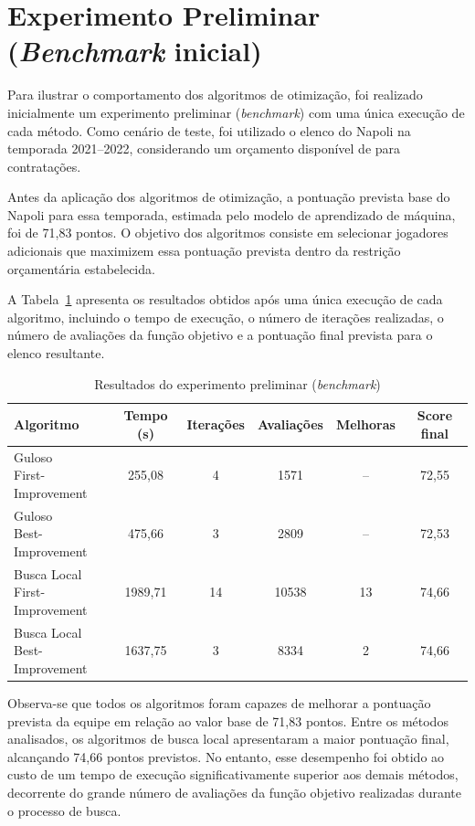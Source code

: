 \section{Experimento Preliminar (\textit{Benchmark} inicial)}

Para ilustrar o comportamento dos algoritmos de otimização, foi realizado inicialmente um experimento preliminar (\textit{benchmark}) com uma única execução de cada método. 
Como cenário de teste, foi utilizado o elenco do Napoli na temporada 2021--2022, considerando um orçamento disponível de  para contratações.

Antes da aplicação dos algoritmos de otimização, a pontuação prevista base do Napoli para 
essa temporada, estimada pelo modelo de aprendizado de máquina, foi de 71,83 pontos. 
O objetivo dos algoritmos consiste em selecionar jogadores adicionais que maximizem 
essa pontuação prevista dentro da restrição orçamentária estabelecida.

A Tabela~\ref{tab:benchmark_inicial} apresenta os resultados obtidos após uma única 
execução de cada algoritmo, incluindo o tempo de execução, 
o número de iterações realizadas, o número de avaliações da função objetivo e a 
pontuação final prevista para o elenco resultante.

\begin{table}[H]
\centering
\caption{Resultados do experimento preliminar (\textit{benchmark})}
\label{tab:benchmark_inicial}
\begin{tabular}{lccccc}
\toprule
Algoritmo & Tempo (s) & Iterações & Avaliações & Melhoras & Score final \\
\midrule
\makecell[l]{Guloso \\ First-Improvement} & 255,08 & 4 & 1571 & -- & 72,55 \\[4pt]
\makecell[l]{Guloso \\ Best-Improvement} & 475,66 & 3 & 2809 & -- & 72,53 \\[10pt]
\makecell[l]{Busca Local \\ First-Improvement} & 1989,71 & 14 & 10538 & 13 & 74,66 \\[4pt]
\makecell[l]{Busca Local \\ Best-Improvement} & 1637,75 & 3 & 8334 & 2 & 74,66 \\
\bottomrule
\end{tabular}
\end{table}

Observa-se que todos os algoritmos foram capazes de melhorar a pontuação prevista 
da equipe em relação ao valor base de 71,83 pontos. 
Entre os métodos analisados, os algoritmos de busca local apresentaram a maior 
pontuação final, alcançando 74,66 pontos previstos. 
No entanto, esse desempenho foi obtido ao custo de um tempo de execução significativamente 
superior aos demais métodos, decorrente do grande número de avaliações 
da função objetivo realizadas durante o processo de busca.

